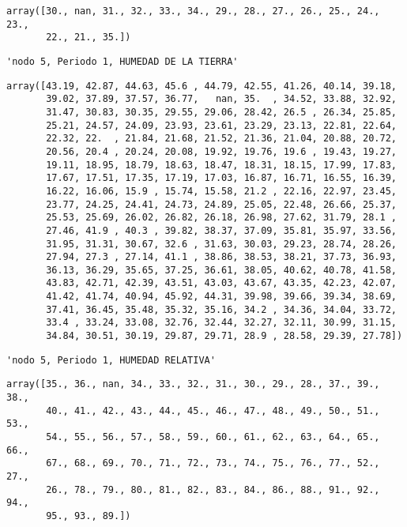 \documentclass[11pt]{article}
\begin{document}
    
    
    \begin{verbatim}
array([30., nan, 31., 32., 33., 34., 29., 28., 27., 26., 25., 24., 23.,
       22., 21., 35.])
    \end{verbatim}

    
    
    \begin{verbatim}
'nodo 5, Periodo 1, HUMEDAD DE LA TIERRA'
    \end{verbatim}

    
    
    \begin{verbatim}
array([43.19, 42.87, 44.63, 45.6 , 44.79, 42.55, 41.26, 40.14, 39.18,
       39.02, 37.89, 37.57, 36.77,   nan, 35.  , 34.52, 33.88, 32.92,
       31.47, 30.83, 30.35, 29.55, 29.06, 28.42, 26.5 , 26.34, 25.85,
       25.21, 24.57, 24.09, 23.93, 23.61, 23.29, 23.13, 22.81, 22.64,
       22.32, 22.  , 21.84, 21.68, 21.52, 21.36, 21.04, 20.88, 20.72,
       20.56, 20.4 , 20.24, 20.08, 19.92, 19.76, 19.6 , 19.43, 19.27,
       19.11, 18.95, 18.79, 18.63, 18.47, 18.31, 18.15, 17.99, 17.83,
       17.67, 17.51, 17.35, 17.19, 17.03, 16.87, 16.71, 16.55, 16.39,
       16.22, 16.06, 15.9 , 15.74, 15.58, 21.2 , 22.16, 22.97, 23.45,
       23.77, 24.25, 24.41, 24.73, 24.89, 25.05, 22.48, 26.66, 25.37,
       25.53, 25.69, 26.02, 26.82, 26.18, 26.98, 27.62, 31.79, 28.1 ,
       27.46, 41.9 , 40.3 , 39.82, 38.37, 37.09, 35.81, 35.97, 33.56,
       31.95, 31.31, 30.67, 32.6 , 31.63, 30.03, 29.23, 28.74, 28.26,
       27.94, 27.3 , 27.14, 41.1 , 38.86, 38.53, 38.21, 37.73, 36.93,
       36.13, 36.29, 35.65, 37.25, 36.61, 38.05, 40.62, 40.78, 41.58,
       43.83, 42.71, 42.39, 43.51, 43.03, 43.67, 43.35, 42.23, 42.07,
       41.42, 41.74, 40.94, 45.92, 44.31, 39.98, 39.66, 39.34, 38.69,
       37.41, 36.45, 35.48, 35.32, 35.16, 34.2 , 34.36, 34.04, 33.72,
       33.4 , 33.24, 33.08, 32.76, 32.44, 32.27, 32.11, 30.99, 31.15,
       34.84, 30.51, 30.19, 29.87, 29.71, 28.9 , 28.58, 29.39, 27.78])
    \end{verbatim}

    
    
    \begin{verbatim}
'nodo 5, Periodo 1, HUMEDAD RELATIVA'
    \end{verbatim}

    
    
    \begin{verbatim}
array([35., 36., nan, 34., 33., 32., 31., 30., 29., 28., 37., 39., 38.,
       40., 41., 42., 43., 44., 45., 46., 47., 48., 49., 50., 51., 53.,
       54., 55., 56., 57., 58., 59., 60., 61., 62., 63., 64., 65., 66.,
       67., 68., 69., 70., 71., 72., 73., 74., 75., 76., 77., 52., 27.,
       26., 78., 79., 80., 81., 82., 83., 84., 86., 88., 91., 92., 94.,
       95., 93., 89.])
    \end{verbatim}
\end{document}
